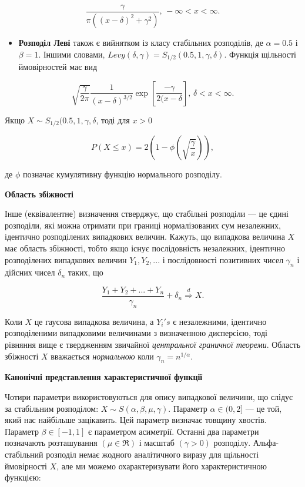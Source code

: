 \documentclass[
  letterpaper,
]{report}
\providecommand{\tightlist}{%
  \setlength{\itemsep}{0pt}\setlength{\parskip}{0pt}}\usepackage{longtable,booktabs,array}
\begin{document}
\[ 
\frac{\gamma}{\pi((x-\delta)^2 + \gamma^2)}, \, -\infty < x < \infty. 
\]

\begin{itemize}
\tightlist
\item
  \textbf{Розподіл Леві} також є вийнятком із класу стабільних
  розподілів, де \(\alpha = 0.5\) і \(\beta = 1\). Іншими словами,
  \(Levy(\delta, \gamma) = S_{1/2}(0.5, 1, \gamma, \delta)\). Функція
  щільності ймовірностей має вид
\end{itemize}

\[ 
\sqrt{\frac{\gamma}{2\pi}}\frac{1}{(x-\delta)^{3/2}}\exp{\left[ \frac{-\gamma}{2(x-\delta} \right]}, \, \delta < x < \infty. 
\]

Якщо \(X \sim S_{1/2}(0.5, 1, \gamma, \delta\), тоді для \(x > 0\)

\[ 
P(X \leq x) = 2 \left( 1 - \phi \left( \sqrt{\frac{\gamma}{x}} \right) \right), 
\]

де \(\phi\) позначає кумулятивну функцію нормального розподілу.

\textbf{Область збіжності}

Інше (еквівалентне) визначення стверджує, що стабільні розподіли --- це
єдині розподіли, які можна отримати при границі нормалізованих сум
незалежних, ідентично розподілених випадкових величин. Кажуть, що
випадкова величина \(X\) має область збіжності, тобто якщо існує
послідовність незалежних, ідентично розподілених випадкових величин
\(Y_1, Y_2, ...\) і послідовності позитивних чисел \({\gamma_n}\) і
дійсних чисел \({\delta_n}\) таких, що

\[  
\frac{Y_1 + Y_2 + ... + Y_n}{\gamma_n} + \delta_n \stackrel{d}{\Rightarrow} X.  
\]

Коли \(X\) це гаусова випадкова величина, а \(Y_i's\) є незалежними,
ідентично розподіленими випадковими величинами з визначенною дисперсією,
тоді рівняння вище є твердженням звичайної \emph{центральної граничної
теореми}. Область збіжності \(X\) вважається \emph{нормальною} коли
\(\gamma_n = n^{1/\alpha}\).

\textbf{Канонічні представлення характеристичної функції}

Чотири параметри використовуються для опису випадкової величини, що
слідує за стабільним розподілом:
\(X \sim S(\alpha, \beta, \mu, \gamma)\). Параметр \(\alpha \in (0, 2]\)
--- це той, який нас найбільше зацікавить. Цей параметр визначає товщину
хвостів. Параметр \(\beta \in [-1, 1]\) є параметром асиметрії. Останні
два параметри позначають розташування \((\mu \in \Re)\) і масштаб
\((\gamma > 0)\) розподілу. Альфа-стабільний розподіл немає жодного
аналітичного виразу для щільності ймовірності \(X\), але ми можемо
охарактеризувати його характеристичною функцією:
\end{document}
